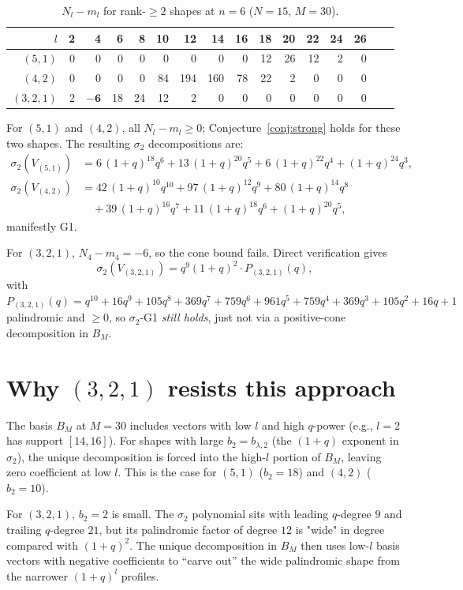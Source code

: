 \documentclass{article}
\theoremstyle{definition}
\begin{document}
\begin{table}[h]
\centering
\caption{$N_l - m_l$ for rank-$\geq 2$ shapes at $n=6$ ($N=15$, $M=30$).}
\begin{tabular}{r|rrrrrrrrrrrrrrr}
$l$ & 2 & 4 & 6 & 8 & 10 & 12 & 14 & 16 & 18 & 20 & 22 & 24 & 26 \\\hline
$(5,1)$ & 0 & 0 & 0 & 0 & 0 & 0 & 0 & 0 & 12 & 26 & 12 & 2 & 0 \\
$(4,2)$ & 0 & 0 & 0 & 0 & 84 & 194 & 160 & 78 & 22 & 2 & 0 & 0 & 0 \\
$(3,2,1)$ & 2 & $\boldsymbol{-6}$ & 18 & 24 & 12 & 2 & 0 & 0 & 0 & 0 & 0 & 0 & 0
\end{tabular}
\end{table}

For $(5,1)$ and $(4,2)$, all $N_l - m_l \geq 0$; Conjecture~\ref{conj:strong}
holds for these two shapes. The resulting $\sigma_2$ decompositions are:
\begin{align*}
\sigma_2(V_{(5,1)}) &= 6\,(1+q)^{18}q^6 + 13\,(1+q)^{20}q^5 + 6\,(1+q)^{22}q^4 + (1+q)^{24}q^3, \\
\sigma_2(V_{(4,2)}) &= 42\,(1+q)^{10}q^{10} + 97\,(1+q)^{12}q^9 + 80\,(1+q)^{14}q^8 \\
&\quad + 39\,(1+q)^{16}q^7 + 11\,(1+q)^{18}q^6 + (1+q)^{20}q^5,
\end{align*}
manifestly G1.

For $(3,2,1)$, $N_4 - m_4 = -6$, so the cone bound fails. Direct verification
gives
\[
  \sigma_2(V_{(3,2,1)}) = q^9(1+q)^2 \cdot P_{(3,2,1)}(q),
\]
with $P_{(3,2,1)}(q) = q^{10}+16q^9+105q^8+369q^7+759q^6+961q^5+759q^4+369q^3+105q^2+16q+1$
palindromic and $\geq 0$, so $\sigma_2$-G1 \emph{still holds}, just not via a
positive-cone decomposition in $B_M$.

\section{Why $(3,2,1)$ resists this approach}

The basis $B_M$ at $M = 30$ includes vectors with low $l$ and high $q$-power
(e.g., $l=2$ has support $[14,16]$). For shapes with large $b_2 = b_{\lambda,2}$
(the $(1+q)$ exponent in $\sigma_2$), the unique decomposition is forced into
the high-$l$ portion of $B_M$, leaving zero coefficient at low $l$. This is
the case for $(5,1)$ ($b_2 = 18$) and $(4,2)$ ($b_2 = 10$).

For $(3,2,1)$, $b_2 = 2$ is small. The $\sigma_2$ polynomial sits with leading
$q$-degree $9$ and trailing $q$-degree $21$, but its palindromic factor of
degree $12$ is "wide" in degree compared with $(1+q)^2$. The unique decomposition
in $B_M$ then uses low-$l$ basis vectors with negative coefficients to
``carve out'' the wide palindromic shape from the narrower $(1+q)^l$ profiles.
\end{document}
